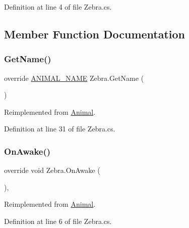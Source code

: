 Definition at line 4 of file Zebra.\+cs.



\subsection{Member Function Documentation}
\mbox{\label{class_zebra_a20dd192a5473bc27ade5c862c9ce7ac4}} 
\subsubsection{\texorpdfstring{Get\+Name()}{GetName()}}
{\footnotesize\ttfamily override \mbox{\hyperlink{_animal_8cs_a2fa5713399b84d1b88dae9196837af50}{A\+N\+I\+M\+A\+L\+\_\+\+N\+A\+ME}} Zebra.\+Get\+Name (\begin{DoxyParamCaption}{ }\end{DoxyParamCaption})\hspace{0.3cm}{\ttfamily [virtual]}}



Reimplemented from \mbox{\hyperlink{class_animal_ab66ea3e3cb15a2b236ba9ba4d589ca69}{Animal}}.



Definition at line 31 of file Zebra.\+cs.

\mbox{\label{class_zebra_a8111cfb00cc72c135c1840c4760855f2}} 
\subsubsection{\texorpdfstring{On\+Awake()}{OnAwake()}}
{\footnotesize\ttfamily override void Zebra.\+On\+Awake (\begin{DoxyParamCaption}{ }\end{DoxyParamCaption})\hspace{0.3cm}{\ttfamily [protected]}, {\ttfamily [virtual]}}



Reimplemented from \mbox{\hyperlink{class_animal_a8ed14f752254b7033466bbd0c846a972}{Animal}}.



Definition at line 6 of file Zebra.\+cs.

\mbox{\label{class_zebra_a3043e9cd3444f7c439e44f8eefbc55e0}} 
